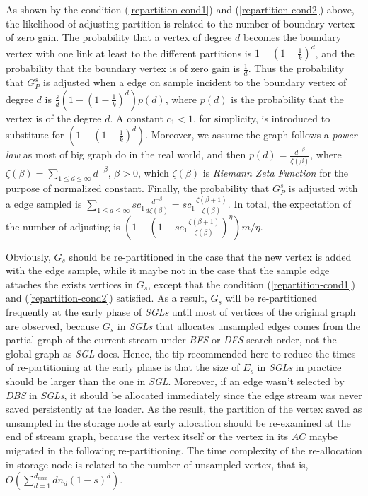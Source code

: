 \documentclass{sig-alternate-2013}
\begin{document}
As shown by the condition (\ref{repartition-cond1}) and  (\ref{repartition-cond2}) above, the likelihood of adjusting partition is related to the number of boundary vertex of zero gain.
The probability that a vertex of degree $d$ becomes the boundary vertex with one link at least to the different partitions is  $1-(1-\frac{1}{k})^d$, and the probability that the boundary vertex is of zero gain is $\frac{1}{d}$. Thus the probability that $G_P^s$ is  adjusted when a edge on sample incident to the boundary vertex of degree $d$ is $\frac{s}{d}(1-(1-\frac{1}{k})^d) p(d)$, where $p(d)$ is the probability that the vertex is of the degree $d$.  A constant $c_1<1$, for  simplicity,  is introduced to substitute for $(1-(1-\frac{1}{k})^d)$. Moreover,  we assume the graph follows a \textit{power law} as most of big graph do in the real world, and then $p(d)=\frac{d^{-\beta}}{\zeta (\beta)}$, where $\zeta (\beta) = \sum_{1\leq d \leq \infty} {d^{-\beta}}$, $\beta > 0$, which $\zeta (\beta)$ is \textit{Riemann Zeta Function} for the purpose of normalized constant. Finally, the probability that $G_P^s$ is  adjusted with a edge sampled is $ \sum_{1\leq d \leq \infty} {s c_1 } \frac{d^{-\beta}}{d \zeta (\beta)}= s c_1\frac{\zeta(\beta+1)}{\zeta (\beta)}$.
In total, the expectation of the number of adjusting is
$(1-(1-s c_1\frac{\zeta(\beta+1)}{\zeta (\beta)})^{\eta}) m/\eta$.

Obviously, $G_s$ should be re-partitioned in the case that the new vertex is added with the edge sample, while it maybe not in the case that the sample edge attaches the exists vertices in $G_s$, except that the condition (\ref{repartition-cond1}) and  (\ref{repartition-cond2}) satisfied. As a result, $G_s$  will be re-partitioned frequently at the early phase of \textit{SGLs} until most of vertices of the original graph are observed, because $G_s$ in \textit{SGLs} that allocates unsampled edges comes from the partial graph of the current stream under \textit{BFS} or \textit{DFS} search order, not the global graph as \textit{SGL} does.
Hence, the tip recommended here to reduce the times of re-partitioning at the early phase is that the size of $E_s$ in \textit{SGLs} in practice should be larger than the one in \textit{SGL}.
Moreover,
if an edge wasn't selected by \textit{DBS} in \textit{SGLs}, it should be allocated immediately since the edge stream was never saved persistently at the loader.
As the result, the partition of the vertex saved as unsampled in the storage node at early allocation should be re-examined at the end of stream graph, because the vertex itself or the vertex in its $AC$ maybe migrated in the following re-partitioning.
The time complexity of the re-allocation in storage node is related to the number of unsampled vertex, that is, $O(\sum_{d=1}^{d_{max}} {d n_d(1-s)^d})$.
\end{document}
